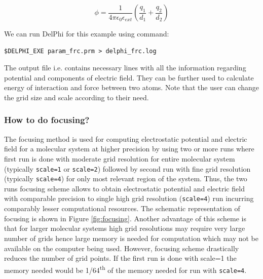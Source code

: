 \documentclass[9pt,tutorial]{livecoms}
\newcommand*\ttvar[1]{\texttt{\expandafter\dottvar\detokenize{#1}\relax}}
\newcommand*\dottvar[1]{\ifx\relax#1\else
  \expandafter\ifx\string_#1\string_\allowbreak\else#1\fi
  \expandafter\dottvar\fi}
\begin{document}
\begin{equation}\label{eqn:frc_at_point}
    \phi = \frac{1}{4\pi\epsilon_0\epsilon_{ext}} \left ( \frac{q_1}{d_1} + \frac{q_2}{d_2} \right)
\end{equation}

We can run DelPhi for this example using command:

\begin{verbatim}
$DELPHI_EXE param_frc.prm > delphi_frc.log
\end{verbatim}

The output \ttvar{frc} file i.e. \ttvar{atoms.frc} contains necessary lines with all the information regarding potential and components of electric field. They can be further used to calculate energy of interaction and force between two atoms. Note that the user can change the grid size and scale according to their need.

\subsubsection{How to do focusing?}

The focusing method is used for computing electrostatic potential and electric field for a molecular system at higher precision by using two or more runs where first run is done with moderate grid resolution for entire molecular system (typically \texttt{scale=1} or \texttt{scale=2}) followed by second run with fine grid resolution (typically \texttt{scale=4}) for only most relevant region of the system.  Thus, the two runs focusing scheme allows to obtain electrostatic potential and electric field with comparable precision to single high grid resolution (\texttt{scale=4}) run incurring comparably lesser computational resources. The schematic representation of focusing is shown in Figure \ref{fig:focusing}. Another advantage of this scheme is that for larger molecular systems high grid resolutions may require very large number of grids hence large memory is needed for computation which may not be available on the computer being used. However, focusing scheme drastically reduces the number of grid points. If the first run is done with scale=1 the memory needed would be \ttvar{~}1/64\textsuperscript{th} of the memory needed for run with \texttt{scale=4}. 
\end{document}
